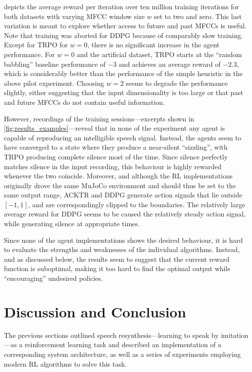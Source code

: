 \documentclass[letterpaper,10pt,conference]{ieeeconf}
\begin{document}
 depicts the average reward per iteration over ten million training iterations for both datasets with varying MFCC window size $w$ set to two and zero. This last variation is meant to explore whether access to future and past MFCCs is useful. Note that training was aborted for DDPG because of comparably slow training. Except for TRPO for $w=0$, there is no significant increase in the agent performance. For $w = 0$ and the artificial dataset, TRPO starts at the \enquote{random babbling} baseline performance of $-3$ and achieves an average reward of $-2.3$, which is considerably better than the performance of the simple heuristic in the above pilot experiment. Choosing $w = 2$ seems to degrade the performance slightly, either suggesting that the input dimensionality is too large or that past and future MFCCs do not contain useful information.

However, recordings of the training sessions---excerpts shown in \cref{fig:results_examples}---reveal that in none of the experiment any agent is capable of reproducing an intelligible speech signal. Instead, the agents seem to have converged to a state where they produce a near-silent \enquote{sizzling}, with TRPO producing complete silence most of the time. Since silence perfectly matches silence in the input recording, this behaviour is highly rewarded whenever the two coincide. Moreover, and although the RL implementations originally drove the same MuJoCo environment and should thus be set to the same output range, ACKTR and DDPG generate action signals that lie outside $[-1, 1]$, and are correspondingly clipped to the boundaries. The relatively large average reward for DDPG seems to be caused the relatively steady action signal, while generating silence at appropriate times.

Since none of the agent implementations shows the desired behaviour, it is hard to evaluate the strengths and weaknesses of the individual algorithms. Instead, and as discussed below, the results seem to suggest that the current reward function is suboptimal, making it too hard to find the optimal output while \enquote{encouraging} undesired policies.

\section{Discussion and Conclusion}
\label{sec:conclusion}

The previous sections outlined speech resynthesis---learning to speak by imitation---as a reinforcement learning task and described an implementation of a corresponding system architecture, as well as a series of experiments employing modern RL algorithms to solve this task.
\end{document}

